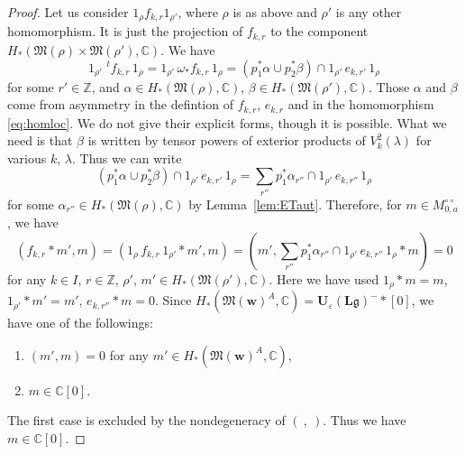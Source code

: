 \documentclass[12pt]{amsart}
\def\Bbb{\mathbb}
\def\frak{\mathfrak}
\renewcommand{\labelenumi}{(\theenumi)}%
\newenvironment{aenume}{%
  \begin{enumerate}%
  \renewcommand{\theenumi}{\alph{enumi}}%
  \renewcommand{\labelenumi}{(\theenumi)}%
  }{\end{enumerate}}
\theoremstyle{definition}
\theoremstyle{remark}
\numberwithin{equation}{subsection}
\newcommand{\lemref}[1]{Lemma~\ref{#1}}
\newcommand{\subsecref}[1]{\S\ref{#1}}
\newcommand{\lsp}[2]{\,{}^{#1}{#2}}
\newcommand{\C}{{\Bbb C}}
\newcommand{\Z}{{\Bbb Z}}
\newcommand{\M}{{\frak M}} %
\newcommand{\bv}{{\mathbf v}} %
\newcommand{\bw}{{\mathbf w}} %
\newcommand{\Ule}{{\mathbf U}_{\varepsilon}({\mathbf L}\mathfrak g)}
\newcommand{\Wedge}{{\textstyle \bigwedge}}
\newcommand{\Mw}{\M(\bw)}
\begin{document}
\begin{proof}
Let us consider $1_\rho f_{k,r} 1_{\rho'}$, where $\rho$ is as above
and $\rho'$ is any other homomorphism. It is just the projection of
$f_{k,r}$ to the component $H_*(\M(\rho)\times \M(\rho'),\C)$. We have
\begin{equation*}
   1_{\rho'}\,\lsp{t}f_{k,r}\,1_{\rho}
   = 1_{\rho'}\, \omega_* f_{k,r}\, 1_{\rho}
   = (p_1^*\alpha \cup p_2^* \beta) \cap 1_{\rho'}\, e_{k,r'}\, 1_{\rho}
\end{equation*}
for some $r'\in\Z$, and $\alpha\in H_*(\M(\rho),\C)$,
$\beta\in H_*(\M(\rho'),\C)$.
Those $\alpha$ and $\beta$ come from asymmetry in the defintion of
$f_{k,r}$, $e_{k,r}$ and in the homomorphism \eqref{eq:homloc}.
We do not give their explicit forms, though it is possible.
What we need is that $\beta$ is written
%
%
by tensor powers of exterior products of $V_k^2(\lambda)$ for various
$k$, $\lambda$.
Thus we can write
\begin{equation*}
   (p_1^*\alpha \cup p_2^* \beta) \cap
   1_{\rho'}\, e_{k,r'}\, 1_{\rho}
   = \sum_{r''} p_1^* \alpha_{r''} \cap 1_{\rho'}\, e_{k,r''}\, 1_{\rho}
\end{equation*}
for some $\alpha_{r''}\in H_*(\M(\rho),\C)$ by \lemref{lem:ETaut}.
Therefore, for $m\in M_{0,a}^{\circ\circ}$, we have
\begin{equation*}
   (f_{k,r}\ast m', m) 
   = (1_\rho\, f_{k,r}\, 1_{\rho'}\ast m', m) 
   = \left(m', \sum_{r''} p_1^* \alpha_{r''} \cap
            1_{\rho'}\,e_{k,r''}\, 1_{\rho} \ast m\right)
   = 0
\end{equation*}
for any $k\in I$, $r\in\Z$, $\rho'$, $m'\in H_*(\M(\rho'),\C)$.
Here we have used $1_\rho\ast m= m$, $1_{\rho'}\ast m' = m'$,
$e_{k,r''}\ast m = 0$.
Since $H_*(\Mw^A,\C) = \Ule^-\ast[0]$, we have
one of the followings:
\begin{aenume}
\item $(m',m) = 0$ for any $m'\in H_*(\Mw^A,\C)$,
\item $m\in \C[0]$.
\end{aenume}
The first case is excluded by the nondegeneracy of $(\ ,\ )$.
Thus we have $m \in \C[0]$.


\end{proof}
\end{document}
